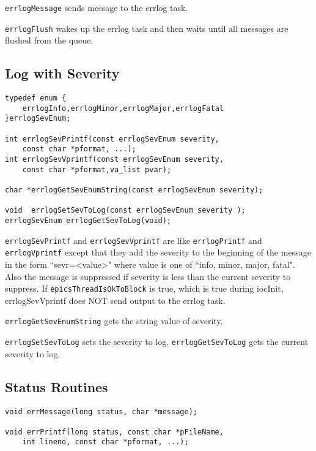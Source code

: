 \verb|errlogMessage| sends message to the errlog task.

\verb|errlogFlush| wakes up the errlog task and then waits until all messages are flushed from the queue.

\subsection{Log with Severity}

\begin{verbatim}
typedef enum {
    errlogInfo,errlogMinor,errlogMajor,errlogFatal
}errlogSevEnum;

int errlogSevPrintf(const errlogSevEnum severity,
    const char *pformat, ...);
int errlogSevVprintf(const errlogSevEnum severity,
    const char *pformat,va_list pvar);

char *errlogGetSevEnumString(const errlogSevEnum severity);

void  errlogSetSevToLog(const errlogSevEnum severity );
errlogSevEnum errlogGetSevToLog(void);
\end{verbatim}

\verb|errlogSevPrintf| and \verb|errlogSevVprintf| are like \verb|errlogPrintf| and  \verb|errlogVprintf| except that they add the severity to the beginning of the message in the form ``sevr=\textless{}value\textgreater{}" where value is one of ``info, minor, major, fatal".
Also the message is suppressed if  severity is less than the current severity to suppress.
If \verb|epicsThreadIsOkToBlock| is true, which is true during iocInit, errlogSevVprintf does NOT send output to the errlog task.

\verb|errlogGetSevEnumString| gets the string value of severity.

\verb|errlogSetSevToLog| sets the severity to log.
\verb|errlogGetSevToLog| gets the current severity to log.

\subsection{Status Routines }

\begin{verbatim}
void errMessage(long status, char *message);

void errPrintf(long status, const char *pFileName,
    int lineno, const char *pformat, ...);
\end{verbatim}

